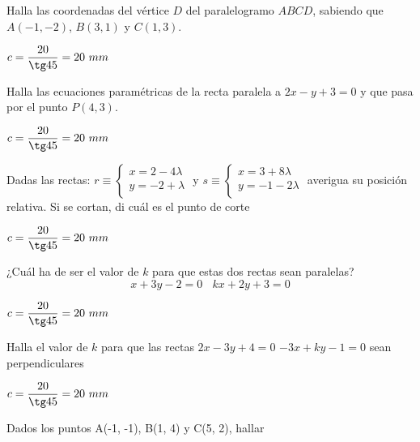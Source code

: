 \documentclass[spanish, 11pt]{exam}
\begin{document}
\begin{questions}
\question Halla las coordenadas del vértice $D$ del paralelogramo $ABCD$, sabiendo que $A(-1, -2)$, $B(3, 1)$ y $C(1, 3)$.
\begin{solution} $c=\dfrac{20}{\tg45} = 20 \ mm $\end{solution}


\question Halla las ecuaciones paramétricas de la recta paralela a $2x - y + 3 = 0 $ y que pasa por el punto $P(4, 3)$.
\begin{solution} $c=\dfrac{20}{\tg45} = 20 \ mm $\end{solution}


\question Dadas las rectas:  $r \equiv \left\{ 
    {\begin{matrix}
	   {x = 2 - 4\lambda }  \\ 
	   {y =  - 2 + \lambda}  \\ 
    \end{matrix} } \right.$ 	y 	
    $s \equiv \left\{ {\begin{matrix}
   {x = 3 + 8\lambda }  \\ 
   {y =  - 1 - 2\lambda }  \\ 
\end{matrix} } \right.$  averigua su posición relativa. Si se cortan, di cuál es el punto de corte

\begin{solution} $c=\dfrac{20}{\tg45} = 20 \ mm $\end{solution}

\question ¿Cuál ha de ser el valor de $k$ para que estas dos rectas sean paralelas? $$x + 3y -2 = 0 \ \ \ \  kx + 2y + 3 = 0$$ 
\begin{solution} $c=\dfrac{20}{\tg45} = 20 \ mm $\end{solution}

\question Halla el valor de $k$ para que las rectas $2x - 3y + 4 = 0 $  $-3x + ky -1 = 0$ 
sean perpendiculares \begin{solution} $c=\dfrac{20}{\tg45} = 20 \ mm $\end{solution}



\question Dados los puntos A(-1, -1), B(1, 4) y C(5, 2), hallar 
\begin{multicols}{2}
\end{multicols}
\end{questions}
\end{document}
